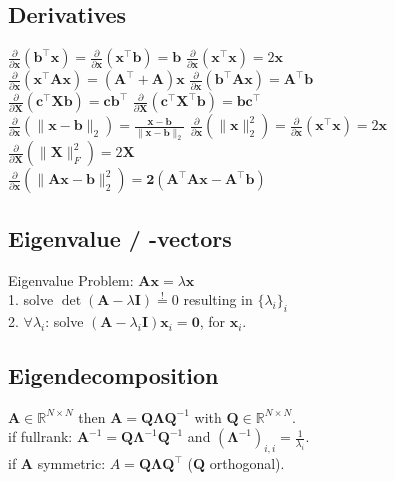 \subsection*{Derivatives}
$\frac{\partial}{\partial \mathbf{x}}(\mathbf{b}^\top \mathbf{x}) = \frac{\partial}{\partial \mathbf{x}}(\mathbf{x}^\top \mathbf{b}) = \mathbf{b}$ \quad
$\frac{\partial}{\partial \mathbf{x}}(\mathbf{x}^\top \mathbf{x}) = 2\mathbf{x}$\\
$\frac{\partial}{\partial \mathbf{x}}(\mathbf{x}^\top \mathbf{A}\mathbf{x}) = (\mathbf{A}^\top + \mathbf{A})\mathbf{x}$ \quad
$\frac{\partial}{\partial \mathbf{x}}(\mathbf{b}^\top \mathbf{A}\mathbf{x}) = \mathbf{A}^\top \mathbf{b}$\\
$\frac{\partial}{\partial \mathbf{X}}(\mathbf{c}^\top \mathbf{X} \mathbf{b}) = \mathbf{c}\mathbf{b}^\top$ \quad
$\frac{\partial}{\partial \mathbf{X}}(\mathbf{c}^\top \mathbf{X}^\top \mathbf{b}) = \mathbf{b}\mathbf{c}^\top$\\
$\frac{\partial}{\partial \mathbf{x}}(\| \mathbf{x}-\mathbf{b} \|_2) = \frac{\mathbf{x}-\mathbf{b}}{\|\mathbf{x}-\mathbf{b}\|_2}$ \quad
$\frac{\partial}{\partial \mathbf{x}}(\|\mathbf{x}\|^2_2) = \frac{\partial}{\partial \mathbf{x}} (\mathbf{x}^\top \mathbf{x}) = 2\mathbf{x}$\\
$\frac{\partial}{\partial \mathbf{X}}(\|\mathbf{X}\|_F^2) = 2\mathbf{X}$ \\
$\frac{\partial}{\partial \mathbf{x}}(\|\mathbf{Ax - b}\|_2^2) = \mathbf{2(A^\top Ax-A^\top b)}$

\subsection*{Eigenvalue / -vectors}
Eigenvalue Problem: $\mathbf{Ax} = \lambda \mathbf{x}$\\
1. solve $\operatorname{det}(\mathbf{A} - \lambda \mathbf{I}) \overset{!}{=} 0$ resulting in $\{\lambda_i\}_i$\\
2. $\forall \lambda_i$:
solve $(\mathbf{A} - \lambda_i \mathbf{I}) \mathbf{x}_i = \mathbf{0}$, for $\mathbf{x}_i$.

\subsection*{Eigendecomposition}
$\mathbf{A} \in \mathbb{R}^{N \times N}$ then $\mathbf{A} = \mathbf{Q} \boldsymbol{\Lambda} \mathbf{Q}^{-1}$ with $\mathbf{Q} \in \mathbb{R}^{N \times N}$.\\
if fullrank: $\mathbf{A}^{-1} = \mathbf{Q} \boldsymbol{\Lambda}^{-1} \mathbf{Q}^{-1}$ and $(\boldsymbol{\Lambda}^{-1})_{i,i} = \frac{1}{\lambda_i}$.\\
if $\mathbf{A}$ symmetric: $A = \mathbf{Q} \boldsymbol{\Lambda} \mathbf{Q^\top}$ ($\mathbf{Q}$ orthogonal).

